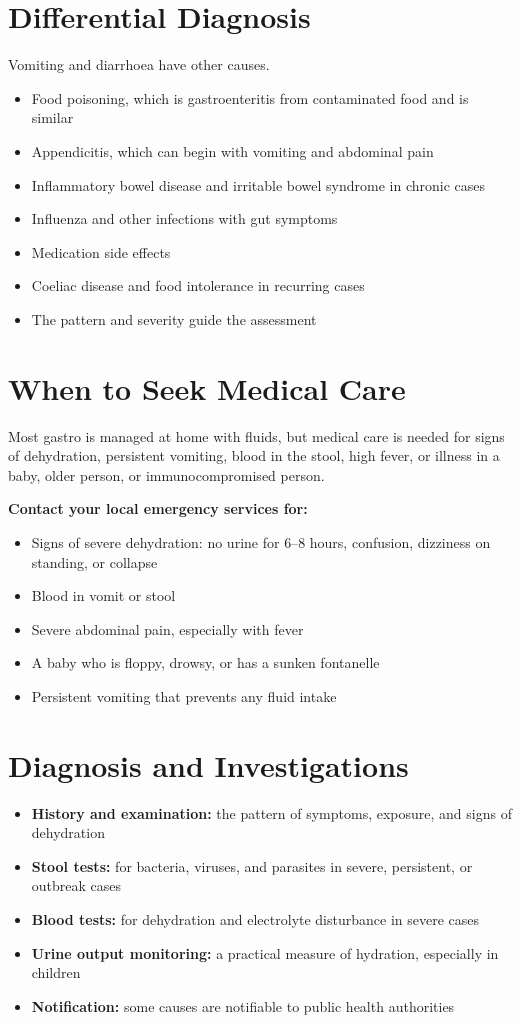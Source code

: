 \section*{Differential Diagnosis}
Vomiting and diarrhoea have other causes.
\begin{itemize}
    \item Food poisoning, which is gastroenteritis from contaminated food and is similar
    \item Appendicitis, which can begin with vomiting and abdominal pain
    \item Inflammatory bowel disease and irritable bowel syndrome in chronic cases
    \item Influenza and other infections with gut symptoms
    \item Medication side effects
    \item Coeliac disease and food intolerance in recurring cases
    \item The pattern and severity guide the assessment
\end{itemize}

\section*{When to Seek Medical Care}
Most gastro is managed at home with fluids, but medical care is needed for signs of dehydration, persistent vomiting, blood in the stool, high fever, or illness in a baby, older person, or immunocompromised person.

\textbf{Contact your local emergency services for:}
\begin{itemize}
    \item Signs of severe dehydration: no urine for 6--8 hours, confusion, dizziness on standing, or collapse
    \item Blood in vomit or stool
    \item Severe abdominal pain, especially with fever
    \item A baby who is floppy, drowsy, or has a sunken fontanelle
    \item Persistent vomiting that prevents any fluid intake
\end{itemize}

\section*{Diagnosis and Investigations}
\begin{itemize}
    \item \textbf{History and examination:} the pattern of symptoms, exposure, and signs of dehydration
    \item \textbf{Stool tests:} for bacteria, viruses, and parasites in severe, persistent, or outbreak cases
    \item \textbf{Blood tests:} for dehydration and electrolyte disturbance in severe cases
    \item \textbf{Urine output monitoring:} a practical measure of hydration, especially in children
    \item \textbf{Notification:} some causes are notifiable to public health authorities
\end{itemize}

